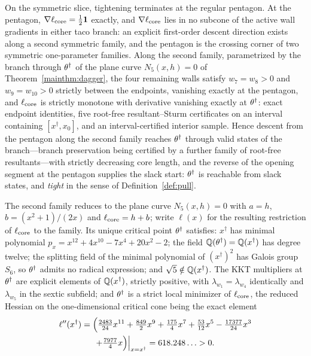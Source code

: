 \begin{mainthm}\label{mainthm:pass}
On the symmetric slice, tightening terminates at the regular pentagon. At the pentagon, $\nabla\ell_{\mathrm{core}}=\tfrac12\mathbf 1$ exactly, and $\nabla\ell_{\mathrm{core}}$ lies in no subcone of the active wall gradients in either taco branch: an explicit first-order descent direction exists along a second symmetric family, and the pentagon is the crossing corner of two symmetric one-parameter families. Along the second family, parametrized by the branch through $\theta^\dagger$ of the plane curve $N_5(x,h)=0$ of Theorem~\textup{\ref{mainthm:dagger}}, the four remaining walls satisfy $w_7=w_8>0$ and $w_9=w_{10}>0$ strictly between the endpoints, vanishing exactly at the pentagon, and $\ell_{\mathrm{core}}$ is strictly monotone with derivative vanishing exactly at $\theta^\dagger$: exact endpoint identities, five root-free resultant--Sturm certificates on an interval containing $[x^\dagger,x_0]$, and an interval-certified interior sample. Hence descent from the pentagon along the second family reaches $\theta^\dagger$ through valid states of the branch---branch preservation being certified by a further family of root-free resultants---with strictly decreasing core length, and the reverse of the opening segment at the pentagon supplies the slack start: $\theta^\dagger$ is reachable from slack states, and \emph{tight} in the sense of Definition~\textup{\ref{def:pull}}.
\end{mainthm}

\begin{mainthm}\label{mainthm:dagger}
The second family reduces to the plane curve $N_5(x,h)=0$ with $a=h$, $b=(x^2+1)/(2x)$ and $\ell_{\mathrm{core}}=h+b$; write $\ell(x)$ for the resulting restriction of $\ell_{\mathrm{core}}$ to the family. Its unique critical point $\theta^\dagger$ satisfies: $x^\dagger$ has minimal polynomial $p_x=x^{12}+4x^{10}-7x^4+20x^2-2$; the field $\mathbb{Q}(\theta^\dagger)=\mathbb{Q}(x^\dagger)$ has degree twelve; the splitting field of the minimal polynomial of $(x^\dagger)^2$ has Galois group $S_6$, so $\theta^\dagger$ admits no radical expression; and $\sqrt5\notin\mathbb{Q}(x^\dagger)$. The KKT multipliers at $\theta^\dagger$ are explicit elements of $\mathbb{Q}(x^\dagger)$, strictly positive, with $\lambda_{w_1}=\lambda_{w_4}$ identically and $\lambda_{w_5}$ in the sextic subfield; and $\theta^\dagger$ is a strict local minimizer of $\ell_{\mathrm{core}}$, the reduced Hessian on the one-dimensional critical cone being the exact element
\begin{multline*}
\ell''(x^\dagger)=\Bigl(\tfrac{2483}{24}x^{11}+\tfrac{849}{2}x^{9}+\tfrac{175}{4}x^{7}+\tfrac{53}{12}x^{5}-\tfrac{17377}{24}x^{3}\\
+\tfrac{7977}{4}x\Bigr)\Big|_{x=x^\dagger}=618.248\ldots>0.
\end{multline*}
\end{mainthm}

